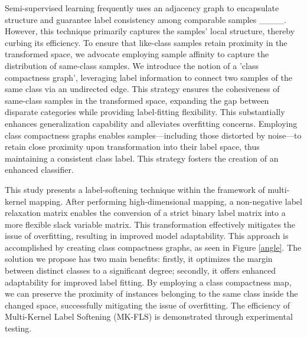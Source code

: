 Semi-supervised learning frequently uses an adjacency graph to encapsulate structure and guarantee label consistency among comparable samples ____. However, this technique primarily captures the samples' local structure, thereby curbing its efficiency. To ensure that like-class samples retain proximity in the transformed space, we advocate employing sample affinity to capture the distribution of same-class samples. We introduce the notion of a 'class compactness graph', leveraging label information to connect two samples of the same class via an undirected edge. This strategy ensures the cohesiveness of same-class samples in the transformed space, expanding the gap between disparate categories while providing label-fitting flexibility. This substantially enhances generalization capability and alleviates overfitting concerns. Employing class compactness graphs enables samples—including those distorted by noise—to retain close proximity upon transformation into their label space, thus maintaining a consistent class label. This strategy fosters the creation of an enhanced classifier.

 

This study presents a label-softening technique within the framework of multi-kernel mapping. After performing high-dimensional mapping, a non-negative label relaxation matrix enables the conversion of a strict binary label matrix into a more flexible slack variable matrix. This transformation effectively mitigates the issue of overfitting, resulting in improved model adaptability. This approach is accomplished by creating class compactness graphs, as seen in Figure \ref{angle}. The solution we propose has two main benefits: firstly, it optimizes the margin between distinct classes to a significant degree; secondly, it offers enhanced adaptability for improved label fitting. By employing a class compactness map, we can preserve the proximity of instances belonging to the same class inside the changed space, successfully mitigating the issue of overfitting. The efficiency of Multi-Kernel Label Softening (MK-FLS) is demonstrated through experimental testing.

